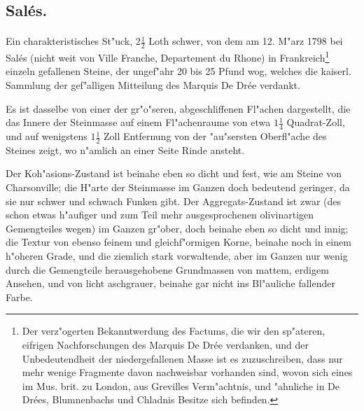 \documentclass[a4paper, 11pt, oneside, german]{article}
\begin{document}
\subsection{Salés.}
\paragraph{}
Ein charakteristisches St"uck, $2\frac{1}{2}$ Loth schwer, von dem am 12. M"arz 1798 bei Salés (nicht weit von Ville Franche, Departement du Rhone) in Frankreich\footnote{Der verz"ogerten Bekanntwerdung des Factums, die wir den sp"ateren, eifrigen Nachforschungen des Marquis De Drée verdanken, und der Unbedeutendheit der niedergefallenen Masse ist es zuzuschreiben, dass nur mehr wenige Fragmente davon nachweisbar vorhanden sind, wovon sich eines im Mus. brit. zu London, aus Grevilles Verm"achtnis, und "ahnliche in De Drées, Blumnenbachs und Chladnis Besitze sich befinden.} einzeln gefallenen Steine, der ungef"ahr 20 bis 25 Pfund wog, welches die kaiserl. Sammlung der gef"alligen Mitteilung des Marquis De Drée verdankt.

Es ist dasselbe von einer der gr"o"seren, abgeschliffenen Fl"achen dargestellt, die das Innere der Steinmasse auf einem Fl"achenraume von etwa $1\frac{1}{4}$ Quadrat-Zoll, und auf wenigstens $1\frac{1}{2}$ Zoll Entfernung von der "au"sersten Oberfl"ache des Steines zeigt, wo n"amlich an einer Seite Rinde ansteht.

Der Koh"asions-Zustand ist beinahe eben so dicht und fest, wie am Steine von Charsonville; die H"arte der Steinmasse im Ganzen doch bedeutend geringer, da sie nur schwer und schwach Funken gibt. Der Aggregats-Zustand ist zwar (des schon etwas h"aufiger und zum Teil mehr ausgesprochenen olivinartigen Gemengteiles wegen) im Ganzen gr"ober, doch beinahe eben so dicht und innig; die Textur von ebenso feinem und gleichf"ormigen Korne, beinahe noch in einem h"oheren Grade, und die ziemlich stark vorwaltende, aber im Ganzen nur wenig durch die Gemengteile herausgehobene Grundmassen von mattem, erdigem Ansehen, und von licht aschgrauer, beinahe gar nicht ins Bl"auliche fallender Farbe.
\end{document}
